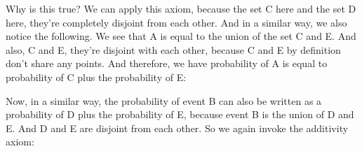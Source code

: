 \documentclass[pdftex, brazil, 12pt, twoside]{article}
\begin{document}
Why is this true?
We can apply this axiom, because the set C here and the set
D here, they're completely disjoint from each other.
And in a similar way, we also notice the following.
We see that A is equal to the union of the set C and E.
And also, C and E, they're disjoint with each other,
because C and E by definition don't share any points.
And therefore, we have probability of A
is equal to probability of C plus the probability of E:

\begin{figure}[H]
  \begin{center}
  \end{center}
\end{figure}

Now,
in a similar way, the probability
of event B can also be written as a probability of D
plus the probability of E, because event B
is the union of D and E.
And D and E are disjoint from each other.
So we again invoke the additivity axiom:

\begin{figure}[H]
  \begin{center}
  \end{center}
\end{figure}
\end{document}
